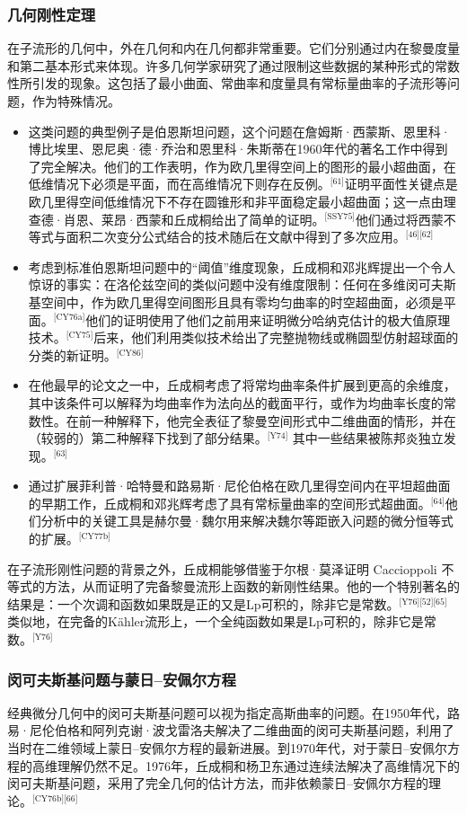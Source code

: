 \subsubsection{几何刚性定理}  
在子流形的几何中，外在几何和内在几何都非常重要。它们分别通过内在黎曼度量和第二基本形式来体现。许多几何学家研究了通过限制这些数据的某种形式的常数性所引发的现象。这包括了最小曲面、常曲率和度量具有常标量曲率的子流形等问题，作为特殊情况。
\begin{itemize}
\item 这类问题的典型例子是伯恩斯坦问题，这个问题在詹姆斯·西蒙斯、恩里科·博比埃里、恩尼奥·德·乔治和恩里科·朱斯蒂在1960年代的著名工作中得到了完全解决。他们的工作表明，作为欧几里得空间上的图形的最小超曲面，在低维情况下必须是平面，而在高维情况下则存在反例。\(^\text{[61]}\)证明平面性关键点是欧几里得空间低维情况下不存在圆锥形和非平面稳定最小超曲面；这一点由理查德·肖恩、莱昂·西蒙和丘成桐给出了简单的证明。\(^\text{[SSY75]}\)他们通过将西蒙不等式与面积二次变分公式结合的技术随后在文献中得到了多次应用。\(^\text{[46][62]}\)
\item 考虑到标准伯恩斯坦问题中的“阈值”维度现象，丘成桐和邓兆辉提出一个令人惊讶的事实：在洛伦兹空间的类似问题中没有维度限制：任何在多维闵可夫斯基空间中，作为欧几里得空间图形且具有零均匀曲率的时空超曲面，必须是平面。\(^\text{[CY76a]}\)他们的证明使用了他们之前用来证明微分哈纳克估计的极大值原理技术。\(^\text{[CY75]}\)后来，他们利用类似技术给出了完整抛物线或椭圆型仿射超球面的分类的新证明。\(^\text{[CY86]}\)
\item 在他最早的论文之一中，丘成桐考虑了将常均曲率条件扩展到更高的余维度，其中该条件可以解释为均曲率作为法向丛的截面平行，或作为均曲率长度的常数性。在前一种解释下，他完全表征了黎曼空间形式中二维曲面的情形，并在（较弱的）第二种解释下找到了部分结果。\(^\text{[Y74]}\) 其中一些结果被陈邦炎独立发现。\(^\text{[63]}\)
\item 通过扩展菲利普·哈特曼和路易斯·尼伦伯格在欧几里得空间内在平坦超曲面的早期工作，丘成桐和邓兆辉考虑了具有常标量曲率的空间形式超曲面。\(^\text{[64]}\)他们分析中的关键工具是赫尔曼·魏尔用来解决魏尔等距嵌入问题的微分恒等式的扩展。\(^\text{[CY77b]}\)
\end{itemize}
在子流形刚性问题的背景之外，丘成桐能够借鉴于尔根·莫泽证明 Caccioppoli 不等式的方法，从而证明了完备黎曼流形上函数的新刚性结果。他的一个特别著名的结果是：一个次调和函数如果既是正的又是Lp可积的，除非它是常数。\(^\text{[Y76][52][65]}\)类似地，在完备的Kähler流形上，一个全纯函数如果是Lp可积的，除非它是常数。\(^\text{[Y76]}\)
\subsubsection{闵可夫斯基问题与蒙日–安佩尔方程}  
经典微分几何中的闵可夫斯基问题可以视为指定高斯曲率的问题。在1950年代，路易·尼伦伯格和阿列克谢·波戈雷洛夫解决了二维曲面的闵可夫斯基问题，利用了当时在二维领域上蒙日–安佩尔方程的最新进展。到1970年代，对于蒙日–安佩尔方程的高维理解仍然不足。1976年，丘成桐和杨卫东通过连续法解决了高维情况下的闵可夫斯基问题，采用了完全几何的估计方法，而非依赖蒙日–安佩尔方程的理论。\(^\text{[CY76b][66]}\)  

